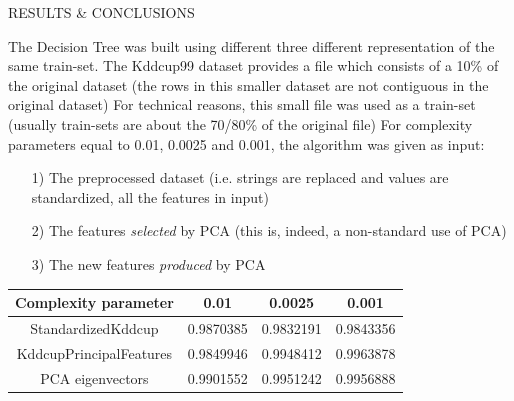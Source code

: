 	\begin{frame}
		\begin{center}
			\begin{Huge}
				RESULTS \& CONCLUSIONS
			\end{Huge}
		\end{center}
	\end{frame}
	
	\begin{frame}
		The Decision Tree was built using different three different representation of the same train-set.\newline\newline
		The Kddcup99 dataset provides a file which consists of a 10\% of the original dataset (the rows in this smaller dataset are not contiguous in the original dataset)\newline\newline
		For technical reasons, this small file was used as a train-set (usually train-sets are about the 70/80\% of the original file)\newline\newline
		For complexity parameters equal to 0.01, 0.0025 and 0.001, the algorithm was given as input:\newline
		\begin{itemize}
			\item[1)] The preprocessed dataset (i.e. strings are replaced and values are standardized, all the features in input)
			\item[2)] The features \emph{selected} by PCA (this is, indeed, a non-standard use of PCA)
			\item[3)] The new features \emph{produced} by PCA
		\end{itemize}
	\end{frame}
	
	\begin{frame}
		\begin{center}
	{\setlength{\extrarowheight}{20pt}
	\begin{tabular}{| c | c | c | c |}
	\hline
		Complexity parameter & 0.01 & 0.0025 & 0.001 \\ \hline
		StandardizedKddcup & 0.9870385 & 0.9832191 & 0.9843356 \\ \hline
		KddcupPrincipalFeatures & 0.9849946 & 0.9948412 & 0.9963878 \\ \hline
		PCA eigenvectors & 0.9901552 & 0.9951242 & 0.9956888 \\ 
		\hline
	\end{tabular}}
\end{center}
	\end{frame}
	
